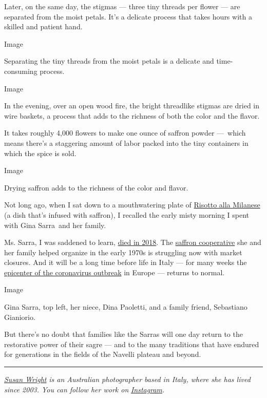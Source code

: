 Later, on the same day, the stigmas --- three tiny threads per flower
--- are separated from the moist petals. It's a delicate process that
takes hours with a skilled and patient hand.

Image

Separating the tiny threads from the moist petals is a delicate and
time-consuming process.

Image

In the evening, over an open wood fire, the bright threadlike stigmas
are dried in wire baskets, a process that adds to the richness of both
the color and the flavor.

It takes roughly 4,000 flowers to make one ounce of saffron powder
---~which means there's a staggering amount of labor packed into the
tiny containers in which the spice is sold.

Image

Drying saffron adds to the richness of the color and flavor.

Not long ago, when I sat down to a mouthwatering plate of
\href{https://cooking.nytimes.com/recipes/3244-risotto-alla-milanese}{Risotto
alla Milanese} (a dish that's infused with saffron), I recalled the
early misty morning I spent with Gina Sarra~and her family.

Ms. Sarra, I was saddened to learn,
\href{https://dreamofitaly.com/2019/01/03/farewell-to-the-signora-of-saffron/}{died
in 2018}. The
\href{https://www.facebook.com/pg/coopaltopianodinavelli/posts/}{saffron
cooperative} she and her family helped organize in the early 1970s is
struggling now with market closures. And it will be a long time before
life in Italy --- for many weeks the
\href{https://www.nytimes.com/interactive/2020/03/27/world/europe/coronavirus-italy-bergamo.html}{epicenter
of the coronavirus outbreak} in Europe --- returns to normal.

Image

Gina Sarra, top left, her niece, Dina Paoletti, and a family friend,
Sebastiano Gianiorio.

But there's no doubt that families like the Sarras will one day return
to the restorative power of their sagre --- and to the many traditions
that have endured for generations in the fields of the Navelli plateau
and beyond.

\begin{center}\rule{0.5\linewidth}{\linethickness}\end{center}

\href{https://susanwrightphoto.com/}{\emph{Susan Wright}} \emph{is an
Australian photographer based in Italy, where she has lived since 2003.
You can follow her work on}
\href{https://www.instagram.com/sw_photo/}{\emph{Instagram}}\emph{.}

